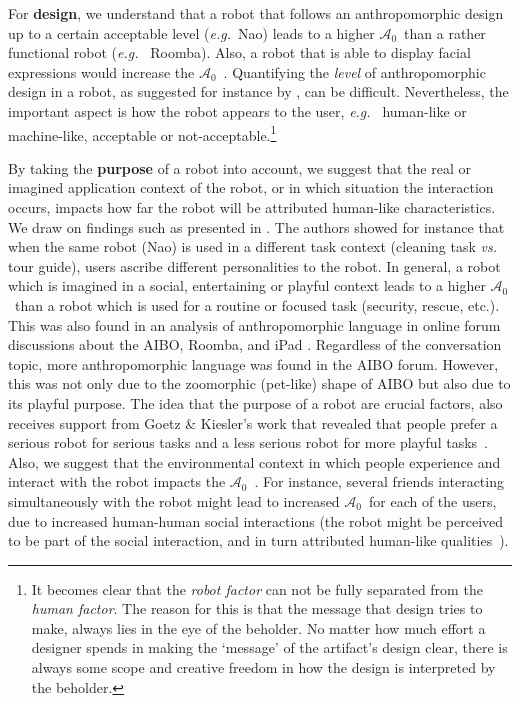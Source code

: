 \documentclass{frontiersSCNS} %
\newcommand{\eg}{{\textit{e.g.~}}}
\newcommand{\ICA}{{$\mathcal{A}_0$~}}
\begin{document}
For \textbf{design}, we understand that a robot that follows an anthropomorphic
design up to a certain acceptable level (\eg Nao) leads to a higher \ICA than a rather functional robot (\eg
Roomba). Also, a robot that is able to display facial expressions would increase
the \ICA. Quantifying the \emph{level} of anthropomorphic design in a robot, as
suggested for instance by \citet{fong_survey_2003}, can be difficult.
Nevertheless, the important aspect is how the robot appears to the user, \eg
human-like or machine-like, acceptable or not-acceptable.\footnote{It becomes clear that the \textit{robot factor} can not be fully separated from the \textit{human factor}. The reason for this is that the message that design tries to make, always lies in the eye of the beholder. No matter how much effort a designer spends in making the `message' of the artifact's design clear, there is always some scope and creative freedom in how the design is interpreted by the beholder.}

By taking the \textbf{purpose} of a robot into account, we suggest that the real
or imagined application context of the robot, or in which situation the interaction occurs, impacts how far the robot will be attributed human-like
characteristics. We draw on findings such as presented in \citet{joosse_what_2013}. The authors showed for instance that when the
same robot (Nao) is used in a different task context (cleaning task \emph{vs.}
tour guide), users ascribe different personalities to the robot. In general,
a robot which is imagined in a social, entertaining or playful
context leads to a higher \ICA than a robot which is used for a routine or
focused task (security, rescue, etc.). This was also found in an analysis of anthropomorphic language in online forum discussions about the AIBO, Roomba, and iPad \citep{fink_anthropomorphic_2012}. Regardless of the conversation topic, more anthropomorphic language was found in the AIBO forum. However, this was not only due to the zoomorphic (pet-like) shape of AIBO but also due to its  playful purpose. The idea that the purpose of a robot are crucial factors, also receives support from
Goetz \& Kiesler's work that revealed that people prefer a serious robot for
serious tasks and a less serious robot for more playful
tasks~\citep{goetz_cooperation_2002, goetz_matching_2003}. Also, we suggest that
the environmental context in which people experience and interact with the robot
impacts the \ICA. For instance, several friends interacting simultaneously with
the robot might lead to increased \ICA for each of the users, due to increased
human-human social interactions (the robot might be perceived to be part of the
social interaction, and in turn attributed human-like
qualities~\citep{baxter2013do}).
\end{document}
